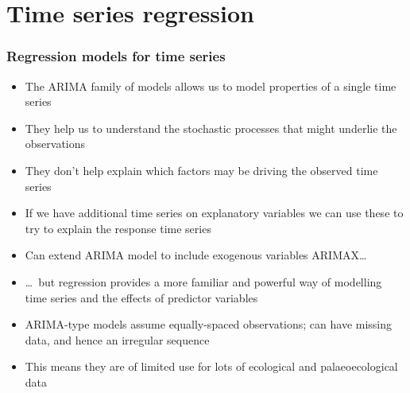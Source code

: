\documentclass{beamer}
\begin{document}
\section{Time series regression}

\begin{frame}
    \frametitle{Regression models for time series}
    \begin{itemize}
        \item The ARIMA family of models allows us to model properties of a single time series
        \item They help us to understand the stochastic processes that might underlie the observations
        \item They don't help explain which factors may be driving the observed time series
        \item If we have additional time series on explanatory variables we can use these to try to explain the response time series
        \item Can extend ARIMA model to include exogenous variables ARIMAX\ldots
        \item \ldots~but regression provides a more familiar and powerful way of modelling time series and the effects of predictor variables
        \item ARIMA-type models assume equally-spaced observations; can have missing data, and hence an irregular sequence
        \item This means they are of limited use for lots of ecological and palaeoecological data
    \end{itemize}
\end{frame}
\end{document}
